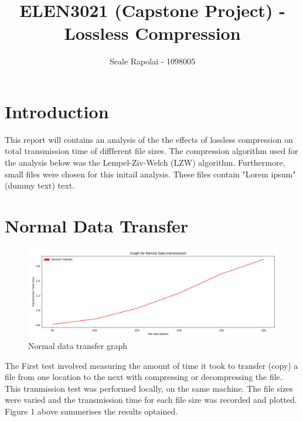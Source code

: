 \documentclass[12pt]{article}
\begin{document}
	\title{ELEN3021 (Capstone Project) - Lossless Compression}
	\author{Seale Rapolai - 1098005}
	\maketitle
	
	\section{Introduction}
	\begin{flushleft}
		This report will contains an analysis of the the effects of lossless compression on total transmission time of diffferent file sizes. The compression algorithm used for the analysis below was the Lempel-Ziv-Welch (LZW) algorithm. Furthermore, small files were chosen for this initail analysis. These files contain "Lorem ipsum" (dummy text) text.
	\end{flushleft}
	
	\section{Normal Data Transfer}
	\begin{figure}[ht]
		\begin{center}
			\includegraphics[scale=0.4]{Figure_1.png}
		\end{center}
		\caption{Normal data transfer graph}
	\end{figure}
	
	\begin{flushleft}
		The First test involved measuring the amount of time it took to transfer (copy) a file from one location to the next with compressing or decompressing the file. This tranmission test was performed locally, on the same machine. The file sizes were varied and the transmission time for each file size was recorded and plotted. Figure 1 above summerises the results optained.
	\end{flushleft}
	
\end{document}
